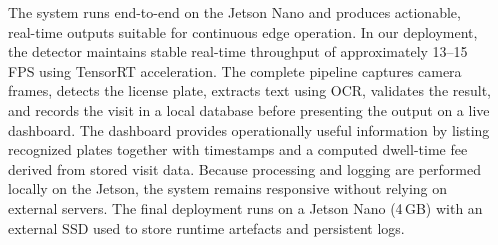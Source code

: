 \documentclass[25pt,a0paper,portrait]{tikzposter}
\begin{document}
\begin{columns}
{{\begin{itemize}
				\end{itemize}
			
			}
			
			{
			The system runs end-to-end on the Jetson Nano and produces actionable, real-time outputs suitable for continuous edge operation. In our deployment, the detector maintains stable real-time throughput of approximately 13--15 FPS using TensorRT acceleration. The complete pipeline captures camera frames, detects the license plate, extracts text using OCR, validates the result, and records the visit in a local database before presenting the output on a live dashboard.
			The dashboard provides operationally useful information by listing recognized plates together with timestamps and a computed dwell-time fee derived from stored visit data. Because processing and logging are performed locally on the Jetson, the system remains responsive without relying on external servers. The final deployment runs on a Jetson Nano (4\,GB) with an external SSD used to store runtime artefacts and persistent logs.
			}
		}
		
	\end{columns}
	
\end{document}
